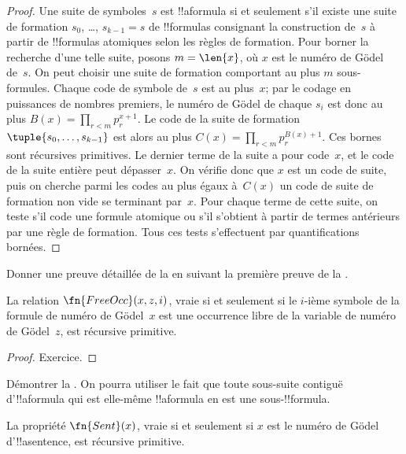 \documentclass[../../../include/open-logic-section]{subfiles}
\begin{document}
\begin{proof}
Une suite de symboles~$s$ est !!a{formula} si et seulement s'il
existe une suite de formation $s_0$, \dots, $s_{k-1} = s$ de
!!{formula}s consignant la construction de~$s$ à partir de
!!{formula}s atomiques selon les règles de formation. Pour borner
la recherche d'une telle suite, posons $m=\len{x}$, où $x$ est le
numéro de G\"odel de~$s$. On peut choisir une suite de formation
comportant au plus $m$ sous-formules. Chaque code de symbole de~$s$
est au plus~$x$; par le codage en puissances de nombres premiers,
le numéro de G\"odel de chaque $s_i$ est donc au plus
$B(x)=\prod_{r<m}p_r^{x+1}$. Le code de la suite de formation
$\tuple{s_0, \dots, s_{k-1}}$ est alors au plus
$C(x)=\prod_{r<m}p_r^{B(x)+1}$. Ces bornes sont
récursives primitives. Le dernier terme de la suite a pour code~$x$,
et le code de la suite entière peut dépasser~$x$. On vérifie donc que
$x$ est un code de suite, puis on cherche parmi les codes au plus
égaux à~$C(x)$ un code de suite de formation non vide se terminant
par~$x$. Pour chaque terme de cette suite, on teste s'il code une
formule atomique ou s'il s'obtient à partir de termes antérieurs
par une règle de formation. Tous ces tests s'effectuent par
quantifications bornées.
\end{proof}

\begin{prob}
Donner une preuve détaillée de la 
en suivant la première preuve de la
.
\end{prob}

\begin{prop}
La relation $\fn{FreeOcc}(x, z, i)$, vraie si et seulement si le
$i$-ième symbole de la formule de numéro de G\"odel~$x$ est une
occurrence libre de la variable de numéro de G\"odel~$z$, est
récursive primitive.
\end{prop}

\begin{proof}
Exercice.
\end{proof}

\begin{prob}
Démontrer la . On pourra
utiliser le fait que toute sous-suite contiguë d'!!a{formula} qui
est elle-même !!a{formula} en est une sous-!!{formula}.
\end{prob}

\begin{prop}
La propriété $\fn{Sent}(x)$, vraie si et seulement si $x$ est le
numéro de G\"odel d'!!a{sentence}, est récursive primitive.
\end{prop}
\end{document}
